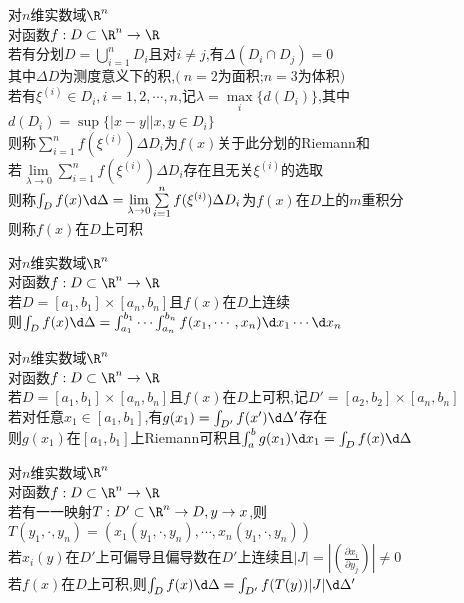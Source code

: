 \begin{dingyi}
对$n$维实数域$\R^n$\\
对函数$f:D\subset \R^n \to \R$\\
若有分划$D=\bigcup\limits_{i=1}^{n}D_i$且对$i\neq j$,有$\Delta (D_i\cap D_j)=0$\\
其中$\Delta D$为测度意义下的积,$(\ n=2$为面积;$n=3$为体积$)$\\
若有$\xi^{(i)}\in D_i,i=1,2,\cdots,n$,记$\lambda=\max\limits_{i}\{d(D_i)\}$,其中$d(D_i)=\sup\{|x-y|\Big|x,y\in D_i\}$\\
则称$\sum\limits_{i=1}^{n}f(\xi^{(i)})\Delta D_i$为$f(x)$关于此分划的Riemann和\\
若$\lim\limits_{\lambda\to 0}\sum\limits_{i=1}^{n}f(\xi^{(i)})\Delta D_i$存在且无关$\xi^{(i)}$的选取\\
则称$\int_{D}f(x)\d \Delta=\lim\limits_{\lambda\to 0}\sum\limits_{i=1}^{n}f(\xi^{(i)})\Delta D_i$为$f(x)$在$D$上的$m$重积分\\
则称$f(x)$在$D$上可积
\end{dingyi}

\begin{dingli}
对$n$维实数域$\R^n$\\
对函数$f:D\subset \R^n \to \R$\\
若$D=[a_1,b_1]\times[a_n,b_n]$且$f(x)$在$D$上连续\\
则$\int_{D}f(x)\d \Delta=\int_{a_1}^{b_1}\cdots\int_{a_n}^{b_n}f(x_1,\cdots,x_n)\d x_1\cdots\d x_n$
\end{dingli}

\begin{dingli}
对$n$维实数域$\R^n$\\
对函数$f:D\subset \R^n \to \R$\\
若$D=[a_1,b_1]\times[a_n,b_n]$且$f(x)$在$D$上可积,记$D'=[a_2,b_2]\times[a_n,b_n]$\\
若对任意$x_1\in [a_1,b_1]$,有$g(x_1)=\int_{D'}f(x')\d \Delta'$存在\\
则$g(x_1)$在$[a_1,b_1]$上Riemann可积且$\int_{a}^{b}g(x_1)\d x_1=\int_{D}f(x)\d \Delta$
\end{dingli}

\begin{dingli}
对$n$维实数域$\R^n$\\
对函数$f:D\subset \R^n \to \R$\\
若有一一映射$T:D'\subset \R^n\to D,y\to x$,则$T(y_1,\cdot,y_n)=(x_1(y_1,\cdot,y_n),\cdots,x_n(y_1,\cdot,y_n))$\\
若$x_i(y)$在$D'$上可偏导且偏导数在$D'$上连续且$|J|=|(\frac{\partial x_i}{\partial y_j})|\neq 0$\\
若$f(x)$在$D$上可积,则$\int_{D}f(x)\d\Delta =\int_{D'}f(T(y))|J|\d \Delta'$
\end{dingli}

